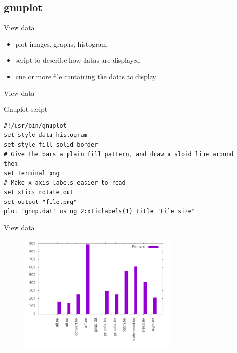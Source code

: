 \subsection{gnuplot}

\begin{frame}[fragile]{View data}
  \begin{itemize}
    \pause \item plot images, graphs, histogram
    \pause \item script to describe how datas are displayed
    \pause \item one or more file containing the datas to display
  \end{itemize}
\end{frame}

\begin{frame}[fragile]{View data}
  \begin{exampleblock}{Gnuplot script}
    \begin{lstlisting}[showstringspaces=false,basicstyle=\tiny]
#!/usr/bin/gnuplot
set style data histogram
set style fill solid border
# Give the bars a plain fill pattern, and draw a sloid line around them
set terminal png
# Make x axis labels easier to read
set xtics rotate out
set output "file.png"
plot 'gnup.dat' using 2:xticlabels(1) title "File size"
    \end{lstlisting}
  \end{exampleblock}
\end{frame}

\begin{frame}[fragile]{View data}
  \begin{figure}[!h]
    \includegraphics[height=6cm]{img/gnup.png}
  \end{figure}
\end{frame}
